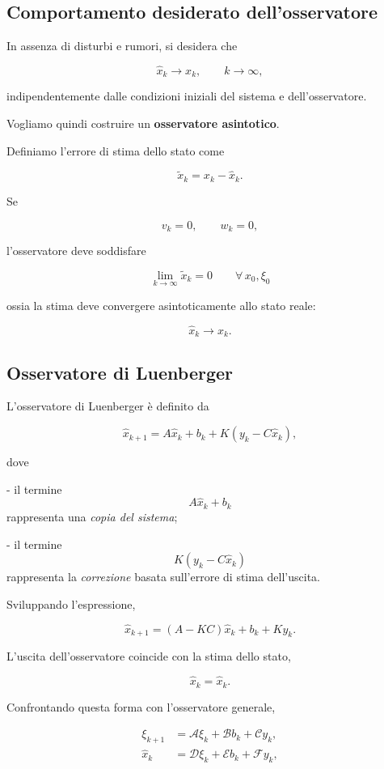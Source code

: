 \documentclass[11pt,a4paper]{article}
\begin{document}
\subsection*{Comportamento desiderato dell'osservatore}

In assenza di disturbi e rumori, si desidera che

\[
\hat{x}_k \longrightarrow x_k,
\qquad k\to\infty,
\]

indipendentemente dalle condizioni iniziali del sistema e dell'osservatore.

Vogliamo quindi costruire un \textbf{osservatore asintotico}.

Definiamo l'errore di stima dello stato come

\[
\tilde{x}_k
=
x_k-\hat{x}_k.
\]

Se

\[
v_k=0,
\qquad
w_k=0,
\]

l'osservatore deve soddisfare

\[
\boxed{
\lim_{k\to\infty}\tilde{x}_k=0
\qquad
\forall\,x_0,\xi_0
}
\]

ossia la stima deve convergere asintoticamente allo stato reale:

\[
\hat{x}_k \longrightarrow x_k.
\]

\subsection*{Osservatore di Luenberger}

L'osservatore di Luenberger è definito da

\[
\hat{x}_{k+1}
=
A\hat{x}_k+b_k
+
K\left(y_k-C\hat{x}_k\right),
\]

dove

- il termine
  \[
  A\hat{x}_k+b_k
  \]
  rappresenta una \emph{copia del sistema};

- il termine
  \[
  K\left(y_k-C\hat{x}_k\right)
  \]
  rappresenta la \emph{correzione} basata sull'errore di stima dell'uscita.

Sviluppando l'espressione,

\[
\boxed{
\hat{x}_{k+1}
=
(A-KC)\hat{x}_k+b_k+Ky_k.
}
\]

L'uscita dell'osservatore coincide con la stima dello stato,

\[
\hat{x}_k=\hat{x}_k.
\]

Confrontando questa forma con l'osservatore generale,

\[
\begin{aligned}
\xi_{k+1}
&=
\mathcal{A}\xi_k
+
\mathcal{B}b_k
+
\mathcal{C}y_k,\\
\hat{x}_k
&=
\mathcal{D}\xi_k
+
\mathcal{E}b_k
+
\mathcal{F}y_k,
\end{aligned}
\]
\end{document}
